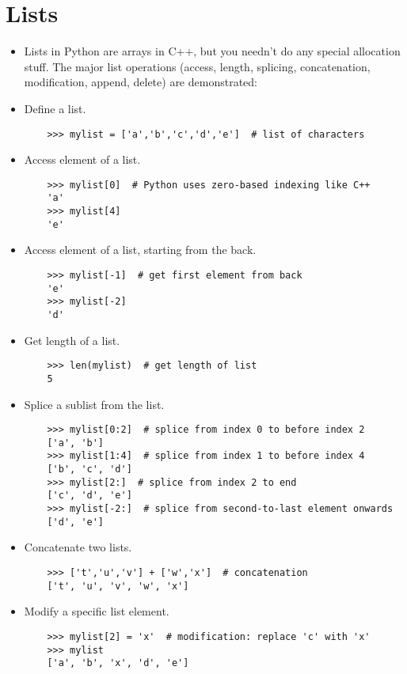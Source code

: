 \documentclass{article}
\begin{document}
\section{Lists}
\begin{itemize}
    \item Lists in Python are arrays in C++, but you needn't do any special allocation stuff. The major list operations (access, length, splicing, concatenation, modification, append, delete) are demonstrated:
    \item Define a list.
    \begin{lstlisting}
    >>> mylist = ['a','b','c','d','e']  # list of characters
    \end{lstlisting}
    \item Access element of a list.
    \begin{lstlisting}
    >>> mylist[0]  # Python uses zero-based indexing like C++
    'a'
    >>> mylist[4]
    'e'
    \end{lstlisting}
    \item Access element of a list, starting from the back.
    \begin{lstlisting}
    >>> mylist[-1]  # get first element from back
    'e'
    >>> mylist[-2]
    'd'
    \end{lstlisting}
    \item Get length of a list.
    \begin{lstlisting}
    >>> len(mylist)  # get length of list
    5
    \end{lstlisting}
    \item Splice a sublist from the list.
    \begin{lstlisting}
    >>> mylist[0:2]  # splice from index 0 to before index 2
    ['a', 'b']
    >>> mylist[1:4]  # splice from index 1 to before index 4
    ['b', 'c', 'd']
    >>> mylist[2:]  # splice from index 2 to end
    ['c', 'd', 'e']
    >>> mylist[-2:]  # splice from second-to-last element onwards
    ['d', 'e']
    \end{lstlisting}
    \item Concatenate two lists.
    \begin{lstlisting}
    >>> ['t','u','v'] + ['w','x']  # concatenation
    ['t', 'u', 'v', 'w', 'x']
    \end{lstlisting}
    \item Modify a specific list element.
    \begin{lstlisting}
    >>> mylist[2] = 'x'  # modification: replace 'c' with 'x'
    >>> mylist
    ['a', 'b', 'x', 'd', 'e']

\end{lstlisting}
\end{itemize}
\end{document}

